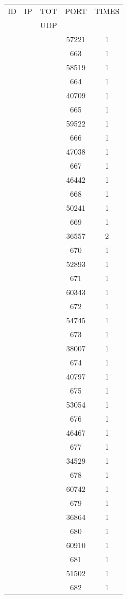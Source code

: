 \documentclass[a4paper]{scrartcl}
\begin{document}
\begin{minipage}[b]{0.5\linewidth}
\begin{tabular}{| c | c | c | c | c |}
\hline
ID & IP & TOT & PORT & TIMES \\ 
   &    & UDP &      &       \\ 
\hline
& & & 57221 & 1 \\ & & & 663 & 1 \\ & & & 58519 & 1 \\ & & & 664 & 1 \\ & & & 40709 & 1 \\ & & & 665 & 1 \\ & & & 59522 & 1 \\ & & & 666 & 1 \\ & & & 47038 & 1 \\ & & & 667 & 1 \\ & & & 46442 & 1 \\ & & & 668 & 1 \\ & & & 50241 & 1 \\ & & & 669 & 1 \\ & & & 36557 & 2 \\ & & & 670 & 1 \\ & & & 52893 & 1 \\ & & & 671 & 1 \\ & & & 60343 & 1 \\ & & & 672 & 1 \\ & & & 54745 & 1 \\ & & & 673 & 1 \\ & & & 38007 & 1 \\ & & & 674 & 1 \\ & & & 40797 & 1 \\ & & & 675 & 1 \\ & & & 53054 & 1 \\ & & & 676 & 1 \\ & & & 46467 & 1 \\ & & & 677 & 1 \\ & & & 34529 & 1 \\ & & & 678 & 1 \\ & & & 60742 & 1 \\ & & & 679 & 1 \\ & & & 36864 & 1 \\ & & & 680 & 1 \\ & & & 60910 & 1 \\ & & & 681 & 1 \\ & & & 51502 & 1 \\ & & & 682 & 1 \\ \hline\end{tabular}\end{minipage} \hfill\begin{minipage}[b]{0.5\linewidth}\begin{tabular}{| c | c | c | c | c |}

\end{tabular}
\end{minipage}
\end{document}
